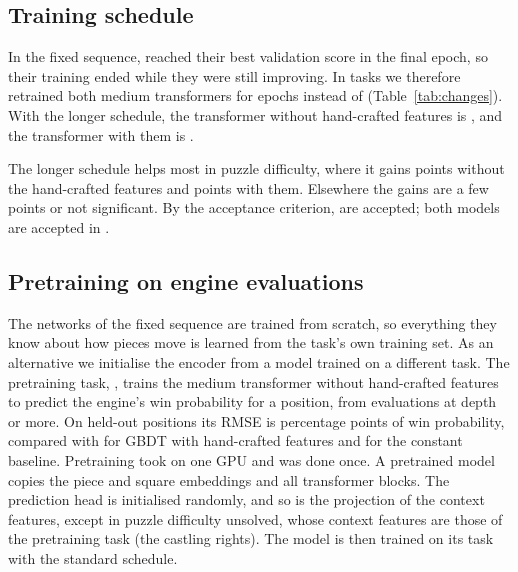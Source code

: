 \documentclass[11pt]{article}
\begin{document}
\subsection{Training schedule}
\label{sec:epochs}

In the fixed sequence,  reached their best
validation score in the final epoch, so their training ended while they were
still improving. In  tasks we
therefore retrained both medium transformers for
 epochs instead of
(Table~\ref{tab:changes}). With the longer schedule, the transformer without
hand-crafted features is ,
and the transformer with them is
.

The longer schedule helps most in puzzle difficulty, where it gains
 points without the
hand-crafted features and
 points with
them. Elsewhere the gains are a few points or not significant. By the
acceptance criterion,  are accepted; both
models are accepted in .

\subsection{Pretraining on engine evaluations}
\label{sec:start}

The networks of the fixed sequence are trained from scratch, so everything
they know about how pieces move is learned from the task's own training set.
As an alternative we initialise the encoder from a model trained on a
different task. The pretraining task, , trains the
medium transformer without hand-crafted features to predict the engine's
win probability for a position, from evaluations at depth
 or more. On
 held-out positions its RMSE is
 percentage points of win probability,
compared with  for GBDT with
hand-crafted features and  for the
constant baseline. Pretraining took  on
one GPU and was done once. A pretrained model copies the piece and square
embeddings and all transformer blocks. The prediction head is initialised
randomly, and so is the projection of the context features, except in puzzle
difficulty unsolved, whose context features are those of the pretraining
task (the castling rights). The model is then trained on its task with the
standard schedule.
\end{document}
